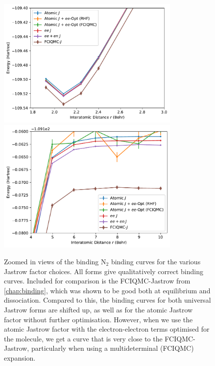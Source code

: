\begin{figure}[htbp]
    \centering
    \includegraphics[width=0.8\textwidth]{figures/universal/n2_avtz_min}
    \includegraphics[width=0.8\textwidth]{figures/universal/n2_avtz_diss}
    \caption{Zoomed in views of the binding N$_2$ binding curves for the various Jastrow factor choices. All forms give qualitatively correct binding curves. Included for comparison is the FCIQMC-Jastrow from \autoref{chap:binding}, which was shown to be good both at equilibrium and dissociation. Compared to this, the binding curves for both universal Jastrow forms are shifted up, as well as for the atomic Jastrow factor without further optimisation. However, when we use the atomic Jastrow factor with the electron-electron terms optimised for the molecule, we get a curve that is very close to the FCIQMC-Jastrow, particularly when using a multideterminal (FCIQMC) expansion. }
    \label{eq:binding-universal-zoom}
\end{figure}

